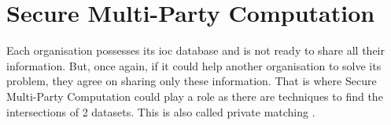 \documentclass{eplmastersthesis}
\begin{document}
%
%
%
%

\section{Secure Multi-Party Computation}
Each organisation possesses its \gls{ioc} database and is not ready to share all their information. But, once again, if it could help another organisation to solve its problem, they agree on sharing only these information.
That is where Secure Multi-Party Computation could play a role as there are techniques to find the intersections of 2 datasets. This is also called private matching \cite{agrawal2003information, li2005private}.\\
\end{document}
